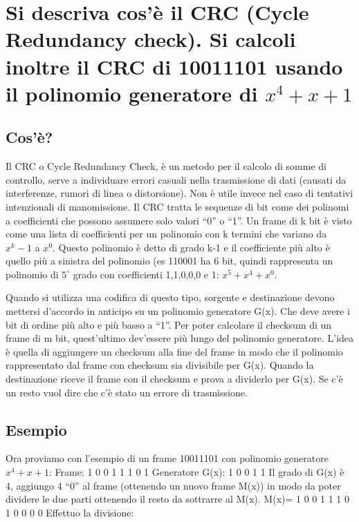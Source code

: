 \section{Si descriva cos'è il CRC (Cycle Redundancy check). Si calcoli inoltre il CRC di 10011101 usando il polinomio generatore di $x^4+x+1$}

\subsection{Cos'è?}
Il CRC o Cycle Redundancy Check, è un metodo per il calcolo di somme di controllo, serve a individuare errori casuali nella trasmissione di dati (causati da interferenze, rumori di linea o distorsione). Non è utile invece nel caso di tentativi intenzionali di manomissione.
Il CRC tratta le sequenze di bit come dei polinomi a coefficienti che possono assumere solo valori “0” o “1”. Un frame di k bit è visto come una lista di coefficienti per un polinomio con k termini che variano da $x^k-1$ a $x^0$. Questo polinomio è detto di grado k-1 e il coefficiente più alto è quello più a sinistra del polinomio (es 110001 ha 6 bit, quindi rappresenta un polinomio di $5^{\circ}$ grado con coefficienti 1,1,0,0,0 e 1: $x^5+x^4+x^0$.

Quando si utilizza una codifica di questo tipo, sorgente e destinazione devono mettersi d'accordo in anticipo su un polinomio generatore G(x). Che deve avere i bit di ordine più alto e più basso a “1”.
Per poter calcolare il checksum di un frame di m bit, quest'ultimo dev'essere più lungo del polinomio generatore. L'idea è quella di aggiungere un checksum alla fine del frame in modo che il polinomio rappresentato dal frame con checksum sia divisibile per G(x). Quando la destinazione riceve il frame con il checksum e prova a dividerlo per G(x). Se c'è un resto vuol dire che c'è stato un errore di trasmissione.
\subsection{Esempio}
Ora proviamo con l'esempio di un frame 10011101 con polinomio generatore $x^4+x+1$:
Frame: 1 0 0 1 1 1 0 1 
Generatore G(x): 1 0 0 1 1
Il grado di G(x) è 4, aggiungo 4 “0” al frame (ottenendo un nuovo frame M(x)) in modo da poter dividere le due parti ottenendo il resto da sottrarre al M(x).
M(x)= 1 0 0 1 1 1 0 1 0 0 0 0
Effettuo la divisione: 

